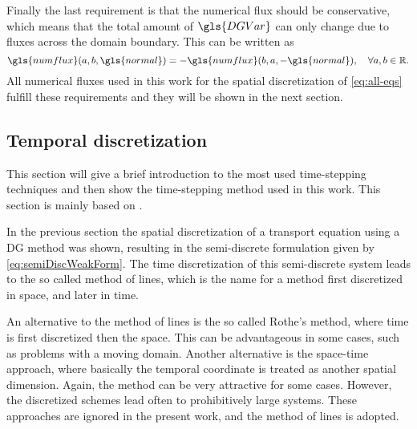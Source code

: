 Finally the last requirement is that the numerical flux should be conservative, which means that the total amount of $\gls{DGVar}$ can only change due to fluxes across the domain boundary. This can be written as
\begin{equation}
	\gls{numflux}(a,b,\gls{normal}) = 	-\gls{numflux}(b,a,-\gls{normal}), \quad \forall a,b \in \mathbb{R}. 
	\label{eq:conservativity}
\end{equation}
All numerical fluxes used in this work for the spatial discretization of \cref{eq:all-eqs} fulfill these requirements and they will be shown in the next section.
\subsection{Temporal discretization}\label{ssec:TemporalDiscretization}
This section will give a brief introduction to the most used time-stepping techniques and then show the time-stepping method used in this work. This section is mainly based on \textcite{levequeFiniteVolumeMethods2002,ferzigerComputationalMethodsFluid2002}.

In the previous section the spatial discretization of a transport equation using a DG method was shown, resulting in the semi-discrete formulation given by \cref{eq:semiDiscWeakForm}.
The time discretization of this semi-discrete system leads to the so called method of lines, which is the name for a method first discretized in space, and later in time.  

An alternative to the method of lines is the so called Rothe's method, where time is first discretized then the space. This can be advantageous in some cases, such as problems with a moving domain. Another alternative is the space-time approach, where basically the temporal coordinate is treated as another spatial dimension. Again, the method can be very attractive for some cases. However, the discretized schemes lead often to prohibitively large systems. These approaches are ignored in the present work, and the method of lines is adopted.

